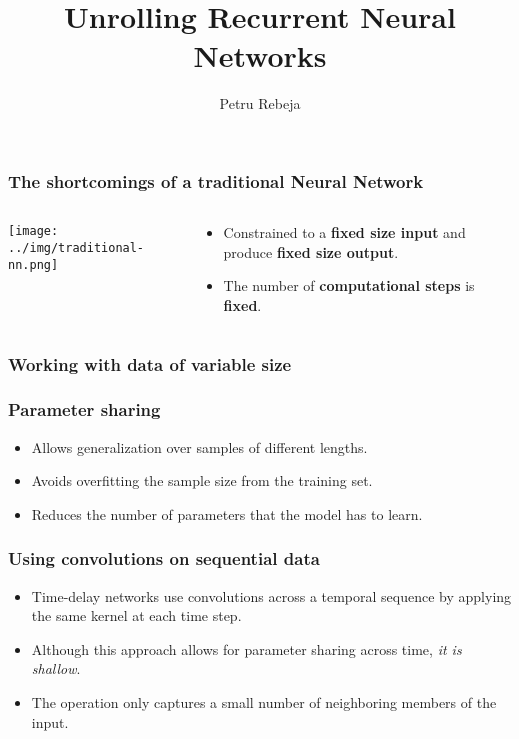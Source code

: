\documentclass{beamer}
\title{Unrolling Recurrent Neural Networks}
\author{Petru Rebeja}
\begin{document}
\maketitle
\begin{frame}
  \frametitle{The shortcomings of a traditional Neural Network \cite{rnn-efectiveness}}
  \begin{columns}
    \begin{column}{0.3\textwidth}
      \begin{center}
        \texttt{[image: ../img/traditional-nn.png]}
      \end{center}
    \end{column}
    \begin{column}{0.7\textwidth}
      \begin{itemize}
        \item Constrained to a \textbf{fixed size input} and produce \textbf{fixed size output}.
        \item The number of \textbf{computational steps} is \textbf{fixed}.
      \end{itemize}
    \end{column}
  \end{columns}
\end{frame}
\begin{frame}
  \frametitle{Working with data of variable size}

\end{frame}
\begin{frame}
  \frametitle{Parameter sharing}
  \begin{itemize}
    \item Allows generalization over samples of different lengths.
    \item Avoids overfitting the sample size from the training set.
    \item Reduces the number of parameters that the model has to learn.
  \end{itemize}
\end{frame}
\begin{frame}
  \frametitle{Using convolutions on sequential data \cite{goodfellow-et-al-2016}}
  \begin{itemize}
    \item Time-delay networks use convolutions across a temporal sequence by applying the same kernel at each time step.
    \item Although this approach allows for parameter sharing across time, \textit{it is shallow}.
    \item The operation only captures a small number of neighboring members of the input.
  \end{itemize}
\end{frame}
\end{document}

